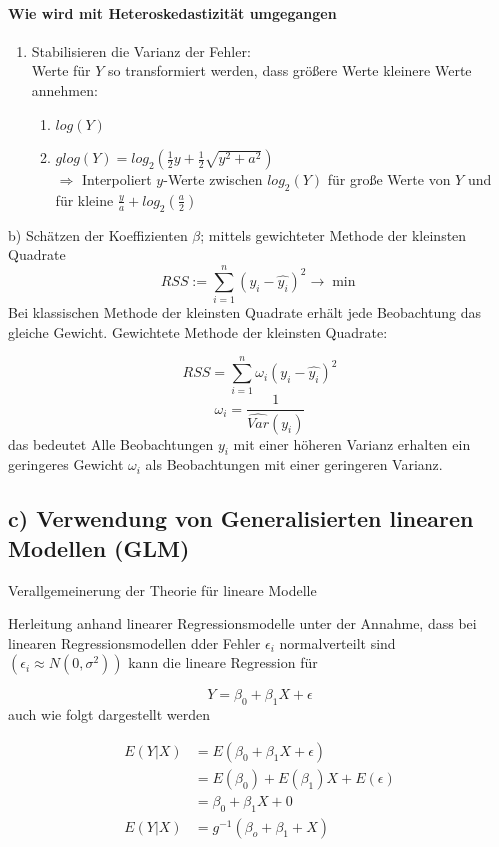 \documentclass[10pt]{report}
\theoremstyle{definition}
\begin{document}
\paragraph{Wie wird mit Heteroskedastizität umgegangen}
\begin{enumerate}
	\item Stabilisieren die Varianz der Fehler:\\
		Werte für $Y$ so transformiert werden, dass größere Werte kleinere Werte annehmen:
		\begin{enumerate}
			\item $log(Y)$
			\item $glog(Y) = log_{2}(\frac{1}{2} y + \frac{1}{2}\sqrt{y^{2} + a^{2}} ) $ \\
				$\Rightarrow$ Interpoliert $y$-Werte zwischen $log_2(Y)$ für große Werte von $Y$ und für kleine $\frac{y}{a} + log_2(\frac{a}{2})$
		\end{enumerate}
\end{enumerate}

\newcommand\tab[1][1cm]{\hspace*{#1}}


b) Schätzen der Koeffizienten \(\beta\); mittels gewichteter Methode der kleinsten Quadrate
\[
RSS := \sum_{i=1}^{n}(y_i - \hat{y_i})^2 \rightarrow \min
\]
Bei klassischen Methode der kleinsten Quadrate erhält jede Beobachtung das gleiche Gewicht.
Gewichtete Methode der kleinsten Quadrate:

\[
RSS = \sum_{i = 1}^{n}\omega_i (y_i - \hat{y_i})^2
\]
\[
\omega_i = \dfrac{1}{\hat{Var}(y_i)}
\]
das bedeutet Alle Beobachtungen \(y_i\) mit einer höheren Varianz erhalten ein geringeres Gewicht \(\omega_i\) als Beobachtungen mit einer geringeren Varianz.

\subsection{c) Verwendung von Generalisierten linearen Modellen (GLM)}
Verallgemeinerung der Theorie für lineare Modelle

Herleitung anhand linearer Regressionsmodelle
unter der Annahme, dass bei linearen Regressionsmodellen dder Fehler \( \epsilon_i\) normalverteilt sind \((\epsilon_i \approx N(0, \sigma^2))\) kann die lineare Regression für

\[
Y = \beta_0 + \beta_1 X + \epsilon
\]
auch wie folgt dargestellt werden

\begin{align*}
E(Y|X) &= E(\beta_0 + \beta_1 X + \epsilon)\\
&=  E(\beta_0) + E(\beta_1) X + E(\epsilon)\\
&= \beta_0 + \beta_1 X + 0\\
E(Y|X) &= g^{-1} (\beta_o + \beta_1 + X)
\end{align*}
\end{document}
